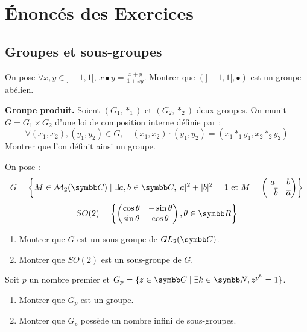 \section{Énoncés des Exercices}
\subsection{Groupes et sous-groupes}
\begin{exercice}
    On pose $\forall x,y\in]-1,1[$, $x\bullet y=\frac{x+y}{1+xy}$.
    Montrer que $(]-1,1[, \bullet)$ est un groupe abélien.
\end{exercice}

\begin{exercice}
    \textbf{Groupe produit.}
    Soient $(G_{1},*_{1})$ et $(G_{2},*_{2})$ deux groupes.
    On munit $G=G_{1}\times G_{2}$ d'une loi de composition interne définie par :
    \[\forall(x_{1},x_{2}), (y_{1}, y_{2}) \in G, \quad (x_{1}, x_{2}) \cdot (y_{1}, y_{2}) = (x_{1} *_{1} y_{1}, x_{2} *_{2} y_{2})\]
    Montrer que l'on définit ainsi un groupe.
\end{exercice}

\begin{exercice}
    On pose :
    \[G=\left\{M\in \mathcal{M}_{2}(\C) \mid \exists a,b\in\C, |a|^{2}+|b|^{2}=1 \text{ et } M=\begin{pmatrix}a&b\\ -\overline{b}&\overline{a}\end{pmatrix}\right\}\]
    \[SO(2)=\left\{\begin{pmatrix}\cos\theta&-\sin\theta\\ \sin\theta&\cos\theta\end{pmatrix}, \theta\in\R\right\}\]
    \begin{enumerate}
        \item Montrer que $G$ est un sous-groupe de $GL_{2}(\C)$.
        \item Montrer que $SO(2)$ est un sous-groupe de $G$.
    \end{enumerate}
\end{exercice}

\begin{exercice}
    Soit $p$ un nombre premier et $G_{p}=\{z\in\C \mid \exists k\in\N, z^{p^{k}}=1\}$.
    \begin{enumerate}
        \item Montrer que $G_{p}$ est un groupe.
        \item Montrer que $G_{p}$ possède un nombre infini de sous-groupes.
    \end{enumerate}
\end{exercice}

